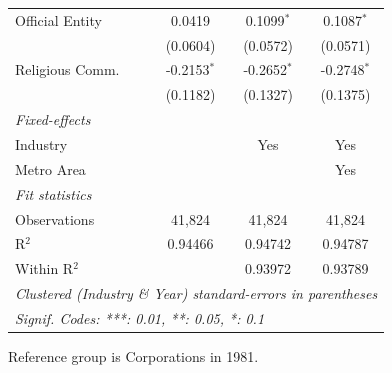 \documentclass[
  12pt]{article}
\begin{document}
\begin{table}
\begin{minipage}{\linewidth}
\begin{tabular}{lccc}
   Official Entity   & 0.0419         & 0.1099$^{*}$   & 0.1087$^{*}$\\   
                     & (0.0604)       & (0.0572)       & (0.0571)\\   
   Religious Comm.   & -0.2153$^{*}$  & -0.2652$^{*}$  & -0.2748$^{*}$\\   
                     & (0.1182)       & (0.1327)       & (0.1375)\\   
   \midrule
   \emph{Fixed-effects}\\
   Industry          &                & Yes            & Yes\\  
   Metro Area        &                &                & Yes\\  
   \midrule
   \emph{Fit statistics}\\
   Observations      & 41,824         & 41,824         & 41,824\\  
   R$^2$             & 0.94466        & 0.94742        & 0.94787\\  
   Within R$^2$      &                & 0.93972        & 0.93789\\  
   \midrule \midrule
   \multicolumn{4}{l}{\emph{Clustered (Industry \& Year) standard-errors in parentheses}}\\
   \multicolumn{4}{l}{\emph{Signif. Codes: ***: 0.01, **: 0.05, *: 0.1}}\\
\end{tabular}

\end{minipage}%
\newline
\begin{minipage}{\linewidth}

\par \raggedright

\end{minipage}%
\newline
\begin{minipage}{\linewidth}

Reference group is Corporations in 1981.

\end{minipage}%
\newline
\begin{minipage}{\linewidth}

\par\endgroup

\end{minipage}%

\end{table}%
\end{document}
